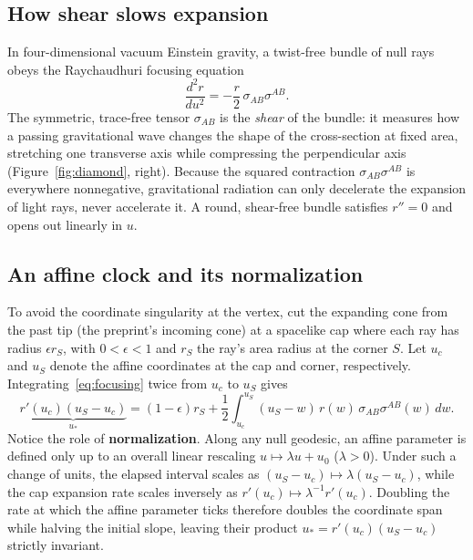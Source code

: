 \documentclass[10pt,a4paper]{article}
\begin{document}
\subsection{How shear slows expansion}
In four-dimensional vacuum Einstein gravity, a twist-free bundle of null rays obeys the Raychaudhuri focusing equation
\begin{equation}
  \frac{d^2 r}{du^2} = -\frac{r}{2}\,\sigma_{AB}\sigma^{AB}.
  \label{eq:focusing}
\end{equation}
The symmetric, trace-free tensor $\sigma_{AB}$ is the \emph{shear} of the bundle: it measures how a passing gravitational wave changes the shape of the cross-section at fixed area, stretching one transverse axis while compressing the perpendicular axis (Figure~\ref{fig:diamond}, right). Because the squared contraction $\sigma_{AB}\sigma^{AB}$ is everywhere nonnegative, gravitational radiation can only decelerate the expansion of light rays, never accelerate it. A round, shear-free bundle satisfies $r'' = 0$ and opens out linearly in $u$.

\subsection{An affine clock and its normalization}
To avoid the coordinate singularity at the vertex, cut the expanding cone from the past tip (the preprint's incoming cone) at a spacelike cap where each ray has radius $\epsilon r_S$, with $0 < \epsilon < 1$ and $r_S$ the ray's area radius at the corner $S$. Let $u_c$ and $u_S$ denote the affine coordinates at the cap and corner, respectively. Integrating~\eqref{eq:focusing} twice from $u_c$ to $u_S$ gives
\begin{equation}
  \underbrace{r'(u_c)(u_S - u_c)}_{u_*}
  = (1 - \epsilon)r_S
  + \frac{1}{2}\int_{u_c}^{u_S} (u_S - w)\,r(w)\,\sigma_{AB}\sigma^{AB}(w)\,dw.
  \label{eq:clock}
\end{equation}
Notice the role of \textbf{normalization}. Along any null geodesic, an affine parameter is defined only up to an overall linear rescaling $u \mapsto \lambda u + u_0$ ($\lambda > 0$). Under such a change of units, the elapsed interval scales as $(u_S - u_c) \mapsto \lambda(u_S - u_c)$, while the cap expansion rate scales inversely as $r'(u_c) \mapsto \lambda^{-1} r'(u_c)$. Doubling the rate at which the affine parameter ticks therefore doubles the coordinate span while halving the initial slope, leaving their product $u_* = r'(u_c)(u_S - u_c)$ strictly invariant.
\end{document}
